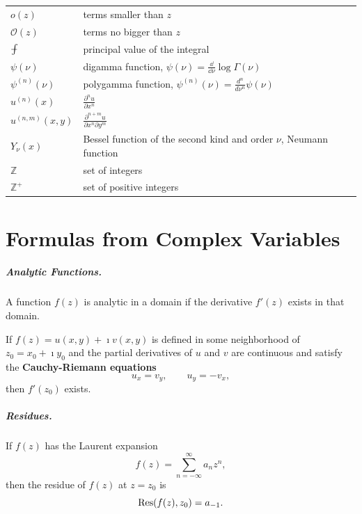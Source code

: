 \begin{longtable}{ll}
  $o(z)$          & terms smaller than $z$ \\
  $\mathcal{O}(z)$        & terms no bigger than $z$ \\
  $- \negthickspace \negthickspace \negthickspace\int$     & principal value of the integral \\
  $\psi(\nu)$        & digamma function, 
  $\psi(\nu) = \frac{\dd}{\dd \nu} \log \Gamma(\nu)$ \\
  $\psi^{(n)}(\nu)$  & polygamma function, 
  $\psi^{(n)}(\nu) = \frac{d^n}{d \nu^n} \psi(\nu)$ \\
  $u^{(n)}(x)$    & $\frac{\partial^n u}{\partial x^n}$ \\
  $u^{(n,m)}(x,y)$        & $\frac{\partial^{n+m}u}{\partial x^n \partial y^m}$ \\
  $Y_\nu(x)$       & Bessel function of the second kind and order $\nu$,
  Neumann function \\
  $\mathbb{Z}$    & set of integers \\
  $\mathbb{Z}^+$  & set of positive integers 
\end{longtable}









\raggedbottom
\chapter{Formulas from Complex Variables}
\flushbottom


\paragraph{Analytic Functions.}
A function $f(z)$ is analytic in a domain if the derivative $f'(z)$ 
exists in that domain.

If $f(z) = u(x, y) + \imath v(x, y)$ is defined in some neighborhood of
$z_0 = x_0 + \imath y_0$ and the partial derivatives of $u$ and $v$ are
continuous and satisfy the \textbf{Cauchy-Riemann equations}
\[
u_x = v_y, \qquad u_y = - v_x,
\]
then $f'(z_0)$ exists.

\paragraph{Residues.}
If $f(z)$ has the Laurent expansion
\[ 
f(z) = \sum_{n=-\infty}^{\infty} a_n z^n, 
\]
then the residue of $f(z)$ at $z = z_0$ is
\[ 
\mathop{\mathrm{Res}}\nolimits(f(z),z_0) = a_{-1}.
\]



